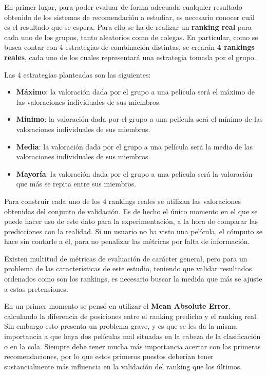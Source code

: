En primer lugar, para poder evaluar de forma adecuada cualquier resultado obtenido de los sistemas de recomendación a estudiar, es necesario conocer cuál es el resultado que se espera. Para ello se ha de realizar un \textbf{ranking real} para cada uno de los grupos, tanto aleatorios como de colegas. En particular, como se busca contar con 4 estrategias de combinación distintas, se crearán \textbf{4 rankings reales}, cada uno de los cuales representará una estrategia tomada por el grupo.

Las 4 estrategias planteadas son las siguientes:

\begin{itemize}
	\item \textbf{Máximo}: la valoración dada por el grupo a una película será el máximo de las valoraciones individuales de sus miembros.
	\item \textbf{Mínimo}: la valoración dada por el grupo a una película será el mínimo de las valoraciones individuales de sus miembros.
	\item \textbf{Media}: la valoración dada por el grupo a una película será la media de las valoraciones individuales de sus miembros.
	\item \textbf{Mayoría}: la valoración dada por el grupo a una película será la valoración que más se repita entre sus miembros.
\end{itemize}

Para construir cada uno de los 4 rankings reales se utilizan las valoraciones obtenidas del conjunto de validación. Es de hecho el único momento en el que se puede hacer uso de este dato para la experimentación, a la hora de comparar las predicciones con la realidad. Si un usuario no ha visto una película, el cómputo se hace sin contarle a él, para no penalizar las métricas por falta de información.

Existen multitud de métricas de evaluación de carácter general, pero para un problema de las características de este estudio, teniendo que validar resultados ordenados como son los rankings, es necesario buscar la medida que más se ajuste a estas pretensiones.

En un primer momento se pensó en utilizar el \textbf{Mean Absolute Error}, calculando la diferencia de posiciones entre el ranking predicho y el ranking real. Sin embargo esto presenta un problema grave, y es que se les da la misma importancia a que haya dos películas mal situadas en la cabeza de la clasificación o en la cola. Siempre debe tener mucha más importancia acertar con las primeras recomendaciones, por lo que estos primeros puestos deberían tener sustancialmente más influencia en la validación del ranking que los últimos.

